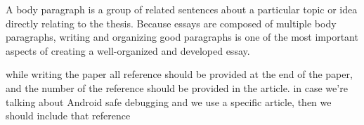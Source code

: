 A body paragraph is a group of related sentences about a particular topic or idea directly relating to the thesis. Because essays are composed of multiple body paragraphs, writing and organizing good paragraphs is one of the most important aspects of creating a well-organized and developed essay.


while writing the paper all reference should be provided at the end of the paper, and the number of the reference should be provided in the article.
in case we're talking about Android safe debugging and we use a specific article, then we should include that reference 